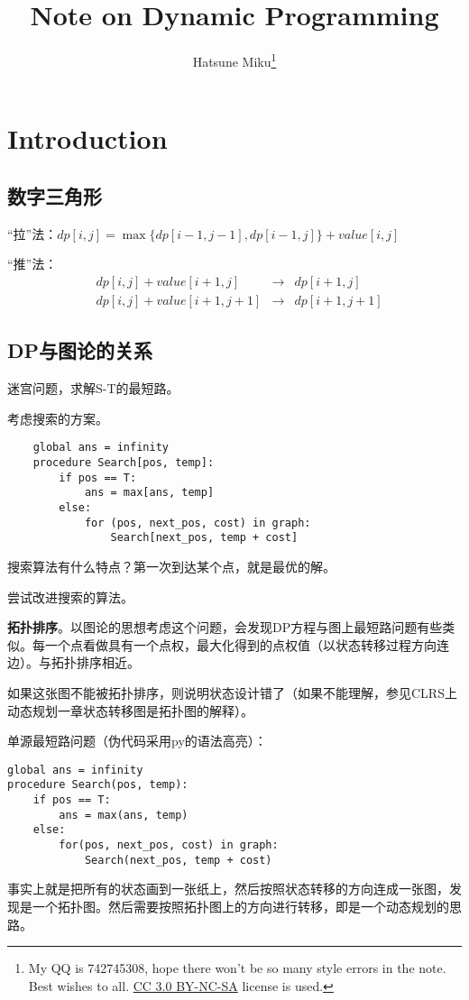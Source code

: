 \documentclass{article}
\begin{document}
\title{Note on Dynamic Programming}\author{Hatsune Miku\footnote{My QQ is 742745308, hope there won't be so many style errors in the note. Best wishes to all. \href{https://creativecommons.org/licenses/by-nc-sa/3.0/}{CC 3.0 BY-NC-SA} license is used.}\date{}}
\maketitle
\tableofcontents
\newpage

\section{Introduction}
\subsection{数字三角形}
“拉”法：$dp[i,j]=\max\{dp[i-1,j-1],dp[i-1,j]\}+value[i,j]$

“推”法：
\begin{equation*}
\begin{aligned}
&dp[i,j]+value[i+1,j]&\to&dp[i+1,j]\\
&dp[i,j]+value[i+1,j+1]&\to&dp[i+1,j+1]
\end{aligned}
\end{equation*}
\subsection{DP与图论的关系}
迷宫问题，求解S-T的最短路。

考虑搜索的方案。
\begin{verbatim}
    global ans = infinity
    procedure Search[pos, temp]:
        if pos == T:
            ans = max[ans, temp]
        else:
            for (pos, next_pos, cost) in graph:
                Search[next_pos, temp + cost]
\end{verbatim}

搜索算法有什么特点？第一次到达某个点，就是最优的解。

尝试改进搜索的算法。

\textbf{拓扑排序}。以图论的思想考虑这个问题，会发现DP方程与图上最短路问题有些类似。每一个点看做具有一个点权，最大化得到的点权值（以状态转移过程方向连边）。与拓扑排序相近。

如果这张图不能被拓扑排序，则说明状态设计错了（如果不能理解，参见CLRS上动态规划一章状态转移图是拓扑图的解释）。

单源最短路问题（伪代码采用py的语法高亮）：
\begin{verbatim}
global ans = infinity
procedure Search(pos, temp):
    if pos == T:
        ans = max(ans, temp)
    else:
        for(pos, next_pos, cost) in graph:
            Search(next_pos, temp + cost)
\end{verbatim}
事实上就是把所有的状态画到一张纸上，然后按照状态转移的方向连成一张图，发现是一个拓扑图。然后需要按照拓扑图上的方向进行转移，即是一个动态规划的思路。
\end{document}
